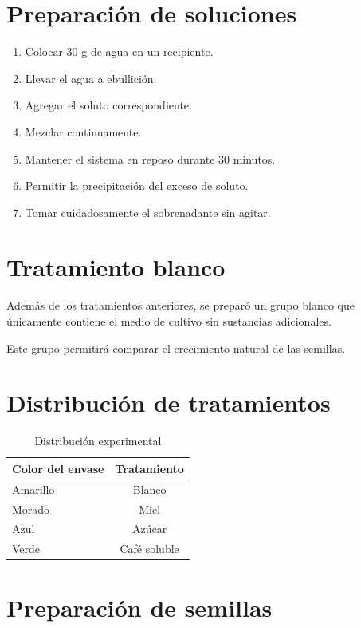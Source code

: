 \section{Preparación de soluciones}

\begin{enumerate}
\item Colocar 30 g de agua en un recipiente.
\item Llevar el agua a ebullición.
\item Agregar el soluto correspondiente.
\item Mezclar continuamente.
\item Mantener el sistema en reposo durante 30 minutos.
\item Permitir la precipitación del exceso de soluto.
\item Tomar cuidadosamente el sobrenadante sin agitar.
\end{enumerate}

\section{Tratamiento blanco}

Además de los tratamientos anteriores, se preparó un grupo blanco que únicamente contiene el medio de cultivo sin sustancias adicionales.

Este grupo permitirá comparar el crecimiento natural de las semillas.

\section{Distribución de tratamientos}

\begin{table}[H]
\centering
\begin{tabular}{lc}
\toprule
Color del envase & Tratamiento \\
\midrule
Amarillo & Blanco \\
Morado & Miel \\
Azul & Azúcar \\
Verde & Café soluble \\
\bottomrule
\end{tabular}
\caption{Distribución experimental}
\end{table}

\section{Preparación de semillas}

